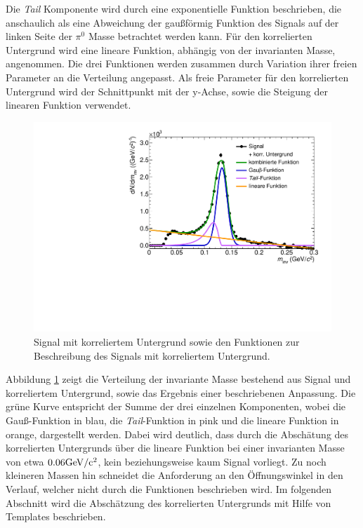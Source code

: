 Die \textit{Tail} Komponente wird durch eine exponentielle Funktion beschrieben, die anschaulich als eine Abweichung der gau{\ss}f\"ormig Funktion des Signals auf der linken Seite der $\pi^{0}$ Masse betrachtet werden kann.
\newline
F\"ur den korrelierten Untergrund wird eine lineare Funktion, abh\"angig von der invarianten Masse, angenommen.
\newline
Die drei Funktionen werden zusammen durch Variation ihrer freien Parameter an die Verteilung angepasst.
Als freie Parameter f\"ur den korrelierten Untergrund wird der Schnittpunkt mit der y-Achse, sowie die Steigung der linearen Funktion verwendet.
\begin{figure}[tp]
\centering
\includegraphics[width=.75\linewidth]{StandardParam.pdf}
\caption{Signal mit korreliertem Untergrund sowie den Funktionen zur Beschreibung des Signals mit korreliertem Untergrund.}
\label{figStandardParam}
\end{figure}
\newline
Abbildung \ref{figStandardParam} zeigt die Verteilung der invariante Masse bestehend aus Signal und korreliertem Untergrund, sowie das Ergebnis einer beschriebenen Anpassung.
Die gr\"une Kurve entspricht der Summe der drei einzelnen Komponenten, wobei die Gau{\ss}-Funktion in blau, die \textit{Tail}-Funktion in pink und die lineare Funktion in orange, dargestellt werden.
Dabei wird deutlich, dass durch die Absch\"atung des korrelierten Untergrunds \"uber die lineare Funktion bei einer invarianten Masse von etwa $0.06\rm{GeV}/c^{2}$, kein beziehungsweise kaum Signal vorliegt.
Zu noch kleineren Massen hin schneidet die Anforderung an den \"Offnungswinkel in den Verlauf, welcher nicht durch die Funktionen beschrieben wird.
\newline
Im folgenden Abschnitt wird die Absch\"atzung des korrelierten Untergrunds mit Hilfe von Templates beschrieben.